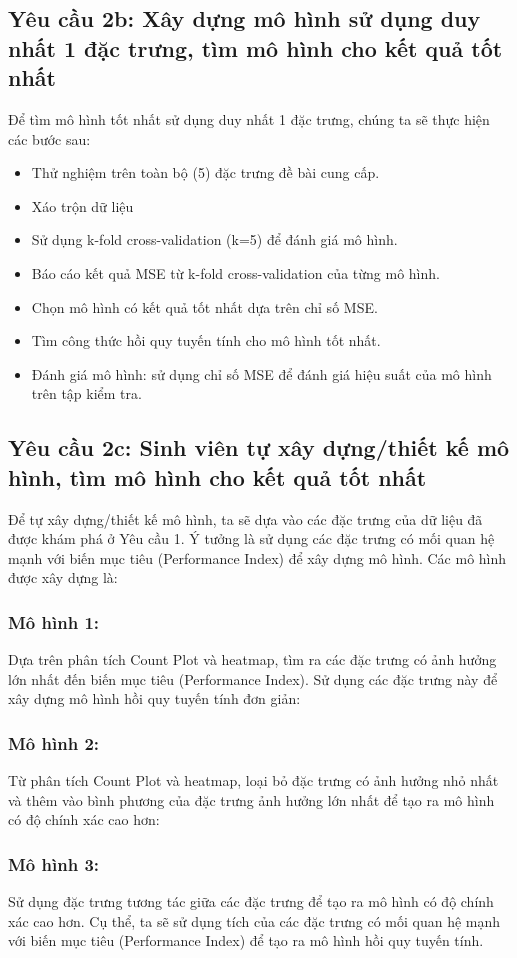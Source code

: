 \subsection{Yêu cầu 2b: Xây dựng mô hình sử dụng duy nhất 1 đặc trưng, tìm mô hình cho kết quả tốt nhất}

Để tìm mô hình tốt nhất sử dụng duy nhất 1 đặc trưng, chúng ta sẽ thực hiện các bước sau:
\begin{itemize}
	\item Thử nghiệm trên toàn bộ (5) đặc trưng đề bài cung cấp.
	\item Xáo trộn dữ liệu
	\item Sử dụng k-fold cross-validation (k=5) để đánh giá mô hình.
	\item Báo cáo kết quả MSE từ k-fold cross-validation của từng mô hình.
	\item Chọn mô hình có kết quả tốt nhất dựa trên chỉ số MSE.
	\item Tìm công thức hồi quy tuyến tính cho mô hình tốt nhất.
	\item Đánh giá mô hình: sử dụng chỉ số MSE để đánh giá hiệu suất của mô hình trên tập kiểm tra.
\end{itemize}

\subsection{Yêu cầu 2c: Sinh viên tự xây dựng/thiết kế mô hình, tìm mô hình cho kết quả tốt nhất}

Để tự xây dựng/thiết kế mô hình, ta sẽ dựa vào các đặc trưng của dữ liệu đã được khám phá ở Yêu cầu 1. Ý tưởng là sử dụng các đặc trưng có mối quan hệ mạnh với biến mục tiêu (Performance Index) để xây dựng mô hình. Các mô hình được xây dựng là:

\subsubsection{Mô hình 1:}
Dựa trên phân tích Count Plot và heatmap, tìm ra các đặc trưng có ảnh hưởng lớn nhất đến biến mục tiêu (Performance Index). Sử dụng các đặc trưng này để xây dựng mô hình hồi quy tuyến tính đơn giản:


\subsubsection{Mô hình 2:}
Từ phân tích Count Plot và heatmap, loại bỏ đặc trưng có ảnh hưởng nhỏ nhất và thêm vào bình phương của đặc trưng ảnh hưởng lớn nhất để tạo ra mô hình có độ chính xác cao hơn:
\subsubsection{Mô hình 3:}
Sử dụng đặc trưng tương tác giữa các đặc trưng để tạo ra mô hình có độ chính xác cao hơn. Cụ thể, ta sẽ sử dụng tích của các đặc trưng có mối quan hệ mạnh với biến mục tiêu (Performance Index) để tạo ra mô hình hồi quy tuyến tính.


